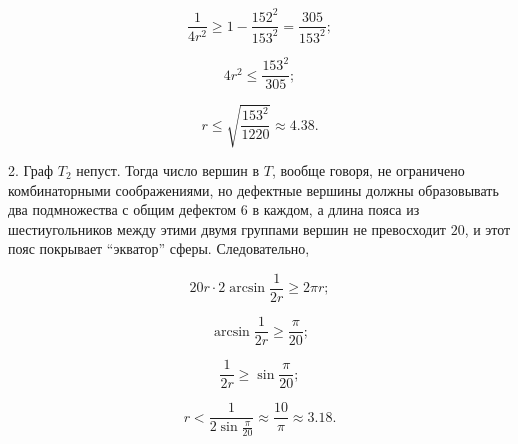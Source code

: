 \begin{myproof}
$$ \frac{1}{4r^2} \geq 1 - \frac{152^2}{153^2} = \frac{305}{153^2}; $$

$$ 4r^2 \leq \frac{153^2}{305}; $$

$$ r \leq \sqrt{\frac{153^2}{1220}} \approx 4.38. $$

2. Граф $T_2$ непуст. Тогда число вершин в $T$, вообще говоря, не ограничено комбинаторными соображениями, 
но дефектные вершины должны образовывать два подмножества с общим дефектом $6$ в каждом, 
а длина пояса из шестиугольников между этими двумя группами вершин не превосходит $20$, 
и этот пояс покрывает \enquote{экватор} сферы. Следовательно,

$$ 20 r \cdot 2 \arcsin \frac{1}{2 r} \geq 2 \pi r; $$

$$ \arcsin \frac{1}{2 r} \geq \frac{\pi}{20}; $$

$$ \frac{1}{2 r} \geq \sin \frac{\pi}{20}; $$

$$ r < \frac{1}{2 \sin \frac{\pi}{20}} \approx \frac{10}{\pi} \approx 3.18. $$

\end{myproof}